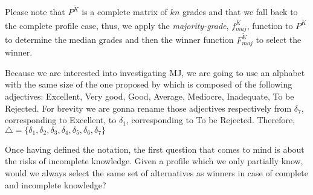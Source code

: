 Please note that $P^{\tilde{K}}$ is a complete matrix of $kn$ grades and that we fall back to the complete profile case, thus, we apply the \emph{majority-grade}, $f^{\tilde{K}}_{maj}$, function to $P^{\tilde{K}}$ to determine the median grades and then the winner function $F^{\tilde{K}}_{maj}$ to select the winner. 

\begin{remark}
	Because we are interested into investigating \acs{MJ}, we are going to use an alphabet with the same size of the one proposed by \citet{Balinski2011} which is composed of the following adjectives: Excellent, Very good, Good, Average, Mediocre, Inadequate, To be Rejected. For brevity we are gonna rename those adjectives respectively from $\delta_7$, corresponding to Excellent, to $\delta_1$, corresponding to To be Rejected. Therefore, $\triangle=\{\delta_1,\delta_2, \delta_3,\delta_4,\delta_5,\delta_6,\delta_7\}$ 
\end{remark}

Once having defined the notation, the first question that comes to mind is about the risks of incomplete knowledge. Given a profile which we only partially know, would we always select the same set of alternatives as winners in case of complete and incomplete knowledge?

